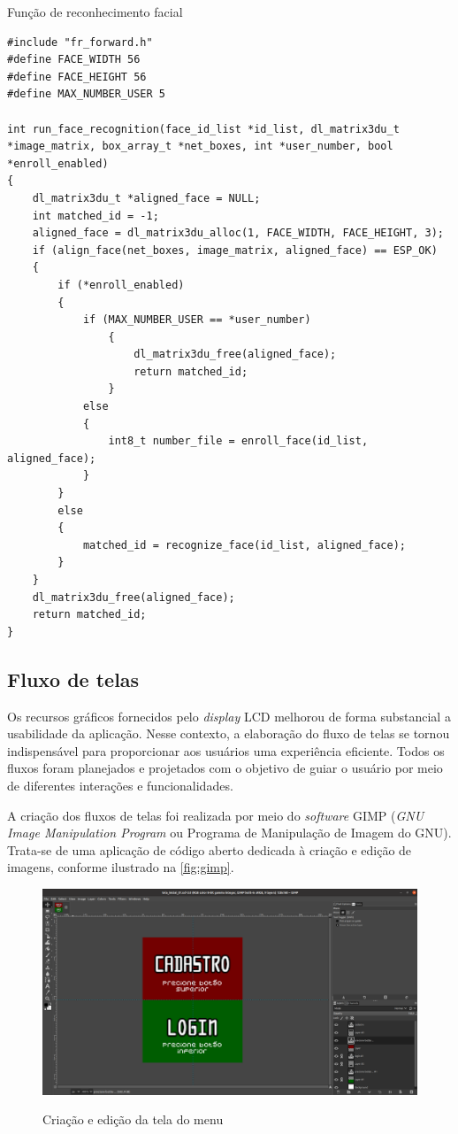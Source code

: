\begin{sourcecode}[htb]
\caption{\label{code:reconhecimento}Função de reconhecimento facial}
\begin{lstlisting}[frame=single]
#include "fr_forward.h"
#define FACE_WIDTH 56
#define FACE_HEIGHT 56
#define MAX_NUMBER_USER 5

int run_face_recognition(face_id_list *id_list, dl_matrix3du_t *image_matrix, box_array_t *net_boxes, int *user_number, bool *enroll_enabled)
{
    dl_matrix3du_t *aligned_face = NULL;
    int matched_id = -1;
    aligned_face = dl_matrix3du_alloc(1, FACE_WIDTH, FACE_HEIGHT, 3);
    if (align_face(net_boxes, image_matrix, aligned_face) == ESP_OK)
    {
        if (*enroll_enabled)
        {
            if (MAX_NUMBER_USER == *user_number)
			    {
				    dl_matrix3du_free(aligned_face);
				    return matched_id;
			    }
            else
            {
                int8_t number_file = enroll_face(id_list, aligned_face);
            }
        }
        else
        {
            matched_id = recognize_face(id_list, aligned_face);
        }
    }
    dl_matrix3du_free(aligned_face);
    return matched_id;
}
\end{lstlisting}
\fonte{}
\end{sourcecode}

\subsection{Fluxo de telas}\label{sec:telas}

Os recursos gráficos fornecidos pelo \textit{display} LCD melhorou de 
forma substancial a usabilidade da aplicação. Nesse contexto, a elaboração 
do fluxo de telas se tornou indispensável para proporcionar aos usuários 
uma experiência eficiente. Todos os fluxos foram planejados e 
projetados com o objetivo de guiar o usuário por meio 
de diferentes interações e funcionalidades.

A criação dos fluxos de telas foi realizada por meio do \textit{software} GIMP 
(\textit{GNU Image Manipulation Program} ou Programa de Manipulação 
de Imagem do GNU). Trata-se de uma aplicação de código aberto 
dedicada à criação e edição de imagens, conforme ilustrado 
na \autoref{fig:gimp}.

\begin{figure}[h!]
    \centering
    \caption{Criação e edição da tela do menu}
    \includegraphics[scale=0.2]{figuras/gimp.png}
    \label{fig:gimp}
    \centering
\end{figure}

